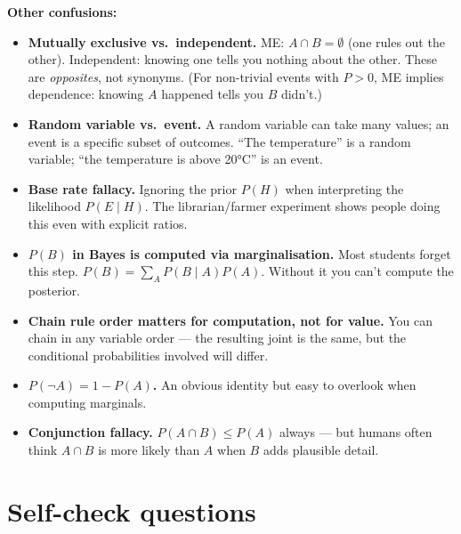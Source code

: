 \documentclass[11pt, a4paper]{article}
\begin{document}
\textbf{Other confusions:}

\begin{itemize}
  \item \textbf{Mutually exclusive vs.\ independent.} ME: $A \cap B = \emptyset$ (one rules out the other). Independent: knowing one tells you nothing about the other. These are \emph{opposites}, not synonyms. (For non-trivial events with $P > 0$, ME implies dependence: knowing $A$ happened tells you $B$ didn't.)
  \item \textbf{Random variable vs.\ event.} A random variable can take many values; an event is a specific subset of outcomes. ``The temperature'' is a random variable; ``the temperature is above 20°C'' is an event.
  \item \textbf{Base rate fallacy.} Ignoring the prior $P(H)$ when interpreting the likelihood $P(E \mid H)$. The librarian/farmer experiment shows people doing this even with explicit ratios.
  \item \textbf{$P(B)$ in Bayes is computed via marginalisation.} Most students forget this step. $P(B) = \sum_A P(B \mid A) P(A)$. Without it you can't compute the posterior.
  \item \textbf{Chain rule order matters for computation, not for value.} You can chain in any variable order — the resulting joint is the same, but the conditional probabilities involved will differ.
  \item \textbf{$P(\neg A) = 1 - P(A)$.} An obvious identity but easy to overlook when computing marginals.
  \item \textbf{Conjunction fallacy.} $P(A \cap B) \le P(A)$ always — but humans often think $A \cap B$ is more likely than $A$ when $B$ adds plausible detail.
\end{itemize}

\section*{Self-check questions}
\end{document}
